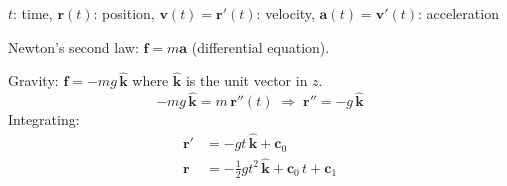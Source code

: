 \begin{example}
  $t$: time, \; $\mathbf{r}(t)$: position, \;
  $\mathbf{v}(t)=\mathbf{r}'(t)$: velocity, \;
  $\mathbf{a}(t)=\mathbf{v}'(t)$: acceleration

  Newton's second law: $\mathbf{f}=m\mathbf{a}$ \; (differential equation).

  Gravity: $\mathbf{f}=-mg\,\hat{\mathbf{k}}$ where $\hat{\mathbf{k}}$ is the unit vector in $z$.
  \[
    -mg\,\hat{\mathbf{k}} = m\,\mathbf{r}''(t)
    \;\Longrightarrow\;
    \mathbf{r}'' = -g\,\hat{\mathbf{k}}
  \]
  Integrating:
  \begin{align*}
    \mathbf{r}' & = -gt\,\hat{\mathbf{k}} + \mathbf{c}_{0} \\
    \mathbf{r}  & = -\tfrac{1}{2}g t^{2}\,\hat{\mathbf{k}}
    + \mathbf{c}_{0}\,t + \mathbf{c}_{1}
  \end{align*}
\end{example}
